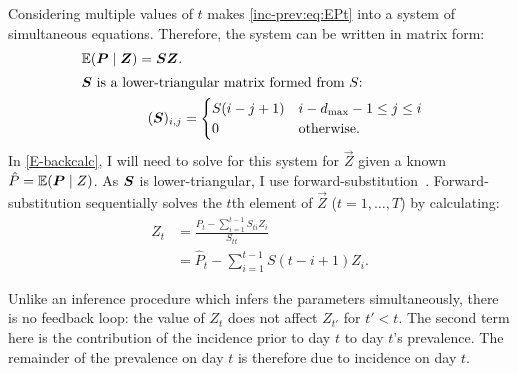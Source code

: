 \documentclass[thesis.tex]{subfiles}
\begin{document}
Considering multiple values of $t$ makes \cref{inc-prev:eq:EPt} into a system of simultaneous equations.
Therefore, the system can be written in matrix form:
\begin{align}
  \operatorname{\mathbb{E}}(\bm{P} \mid \bm{Z}) = \bm{S} \bm{Z}. \label{inc-prev:eq:EPt-matrix} \\
\intertext{$\bm{S}$ is a lower-triangular matrix formed from $S$:}
    (\bm{S})_{i,j} &= \begin{cases}
        S(i - j + 1) & i - d_\text{max} - 1 \leq j \leq i \\
        0 & \text{otherwise.}
    \end{cases} \label{inc-prev:eq:Smatrix}
\end{align}
In \cref{E-backcalc}, I will need to solve for this system for $\vec{Z}$ given a known $\hat{P} = \operatorname{\mathbb{E}}(\bm{P} \mid {Z})$.
As $\bm{S}$ is lower-triangular, I use forward-substitution~\autocite{cormenMatrix}.
Forward-substitution sequentially solves the $t$th element of $\vec{Z}$ ($t = 1, \dots, T$) by calculating:
\begin{align}
Z_t
&= \frac{\hat{P}_t - \sum_{i=1}^{t-1} S_{ti} Z_i}{S_{tt}} \\
&= \hat{P}_t - \sum_{i=1}^{t-1} S(t - i + 1) Z_i.
\label{inc-prev:eq:forward-substitute}
\end{align}


Unlike an inference procedure which infers the parameters simultaneously, there is no feedback loop: the value of $Z_{t}$ does not affect $Z_{t'}$ for $t' < t$.
The second term here is the contribution of the incidence prior to day $t$ to day $t$'s prevalence.
The remainder of the prevalence on day $t$ is therefore due to incidence on day $t$.
\end{document}
